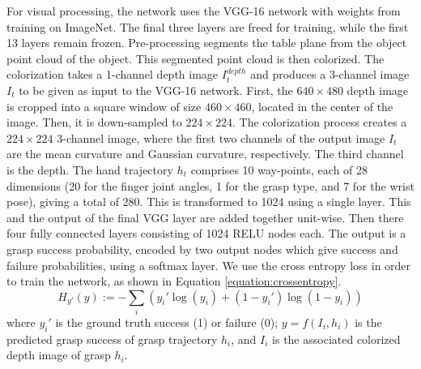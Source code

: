 For visual processing, the network uses the VGG-16 network with weights from training on ImageNet. The final three layers are freed for training, while the first 13 layers remain frozen. Pre-processing segments the table plane from the object point cloud of the object. This segmented point cloud is then colorized. The colorization takes a 1-channel depth image $I_{t}^{depth}$ and produces a 3-channel image $I_t$ to be given as input to the VGG-16 network. First, the $640 \times 480$ depth image is cropped into a square window of size $460 \times 460$, located in the center of the image. Then, it is down-sampled to $224 \times 224$. The colorization process creates a $224 \times 224$ 3-channel image, where the first two channels of the output image $I_t$ are the mean curvature and Gaussian curvature, respectively. The third channel is the depth. %
The hand trajectory $h_t$ comprises 10 way-points, each of 28 dimensions (20 for the finger joint angles, 1 for the grasp type, and 7 for the wrist pose), giving a total of 280. This is transformed to 1024 using a single layer. This and the output of the final VGG layer are added together unit-wise. Then there four fully connected layers consisting of 1024 RELU nodes each. The output is a grasp success probability, encoded by two output nodes which give success and failure probabilities, using a softmax layer.  We use the cross entropy loss in order to train the network, as shown in Equation \ref{equation:crossentropy}.
\begin{equation}
H_{y'}(y) := - \sum_{i} ({y_i' \log(y_i) + (1-y_i') \log (1-y_i)})
\label{equation:crossentropy}
\end{equation}
where $y_i'$ is the ground truth success (1) or failure (0); $y = f(I_i, h_i)$ is the predicted grasp success of grasp trajectory $h_i$, and $I_i$ is the associated colorized depth image of grasp $h_i$.
